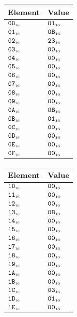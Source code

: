 \documentclass[a4paper,12pt]{article}
\newcommand{\num}[1]{\texttt{#1}}
\newcommand{\hex}[1]{\num{#1}_{\textup{\tiny 16}}}
\begin{document}
\begin{center}
  \begin{tabular}{@{}ll@{}}
    \hline
    Element    & Value \\
    \hline
    $\hex{00}$ & $\hex{01}$ \\
    $\hex{01}$ & $\hex{0B}$ \\
    $\hex{02}$ & $\hex{23}$ \\
    $\hex{03}$ & $\hex{00}$ \\
    $\hex{04}$ & $\hex{00}$ \\
    $\hex{05}$ & $\hex{00}$ \\
    $\hex{06}$ & $\hex{00}$ \\
    $\hex{07}$ & $\hex{00}$ \\
    $\hex{08}$ & $\hex{00}$ \\
    $\hex{09}$ & $\hex{00}$ \\
    $\hex{0A}$ & $\hex{0B}$ \\
    $\hex{0B}$ & $\hex{01}$ \\
    $\hex{0C}$ & $\hex{00}$ \\
    $\hex{0D}$ & $\hex{00}$ \\
    $\hex{0E}$ & $\hex{00}$ \\
    $\hex{0F}$ & $\hex{00}$ \\
    \hline
  \end{tabular}
  \hfil
  \begin{tabular}{@{}ll@{}}
    \hline
    Element    & Value \\
    \hline
    $\hex{10}$ & $\hex{00}$ \\
    $\hex{11}$ & $\hex{00}$ \\
    $\hex{12}$ & $\hex{00}$ \\
    $\hex{13}$ & $\hex{0B}$ \\
    $\hex{14}$ & $\hex{00}$ \\
    $\hex{15}$ & $\hex{00}$ \\
    $\hex{16}$ & $\hex{00}$ \\
    $\hex{17}$ & $\hex{00}$ \\
    $\hex{18}$ & $\hex{00}$ \\
    $\hex{19}$ & $\hex{00}$ \\
    $\hex{1A}$ & $\hex{00}$ \\
    $\hex{1B}$ & $\hex{00}$ \\
    $\hex{1C}$ & $\hex{03}$ \\
    $\hex{1D}$ & $\hex{01}$ \\
    $\hex{1E}$ & $\hex{00}$ \\

\end{tabular}
\end{center}
\end{document}
